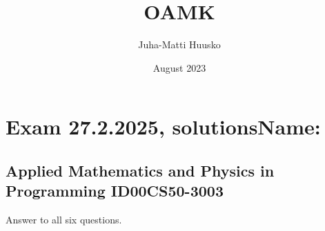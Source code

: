 \documentclass[12pt]{article}
\title{OAMK}
\author{Juha-Matti Huusko}
\date{August 2023}
\begin{document}
\thispagestyle{empty}

\section*{Exam 27.2.2025, solutions\quad\quad Name:}
\subsection*{Applied Mathematics and Physics in Programming ID00CS50-3003}

Answer to all six questions.
\end{document}
